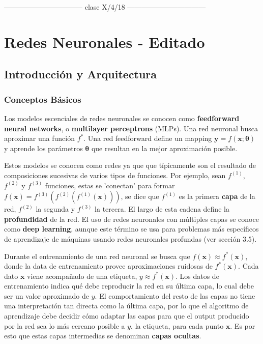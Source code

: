 
\newpage
\centerline{--------------------------------- clase X/4/18 ---------------------------------}
\section{Redes Neuronales - Editado}

\subsection{Introducci\'on y Arquitectura}

\subsubsection{Conceptos B\'asicos}

Los modelos escenciales de redes neuronales se conocen como \textbf{feedforward neural networks}, o \textbf{multilayer perceptrons} (MLPs). Una red neuronal busca aproximar una funci\'on $f^*$. Una red feedforward define un mapping $\bm{y}=f(\bm{x}; \bm{\theta})$ y aprende los par\'ametros $\bm{\theta}$ que resultan en la mejor aproximaci\'on posible.

Estos modelos se conocen como redes ya que que t\'ipicamente son el resultado de composiciones sucesivas de varios tipos de funciones. Por ejemplo, sean $f^{(1)}$, $f^{(2)}$ y $f^{(3)}$ funciones, estas se 'conectan' para formar $f(\bm{x}) = f^{(3)}(f^{(2)}(f^{(1)}(\bm{x})))$, se dice que $f^{(1)}$ es la primera \textbf{capa} de la red, $f^{(2)}$ la segunda y $f^{(3)}$ la tercera. El largo de esta cadena define la \textbf{profundidad} de la red. El uso de redes neuronales con m\'ultiples capas se conoce como \textbf{deep learning}, aunque este t\'ermino se usa para problemas m\'as espec\'ificos de aprendizaje de m\'aquinas usando redes neuronales profundas (ver secci\'on 3.5).

Durante el entrenamiento de una red neuronal se busca que $f(\bm{x}) \approx f^*(\bm{x})$, donde la data de entrenamiento provee aproximaciones ruidosas de $f^*(\bm{x})$. Cada dato $\bm{x}$ viene acompa{\~{n}}ado de una etiqueta, $y \approx f^*(\bm{x})$. Los datos de entrenamiento indica qu\'e debe reproducir la red en su \'ultima capa, lo cual debe ser un valor aproximado de $y$. El comportamiento del resto de las capas no tiene una interpretación tan directa como la última capa, por lo que el algoritmo de aprendizaje debe decidir c\'omo adaptar las capas para que el output producido por la red sea lo m\'as cercano posible a $y$, la etiqueta, para cada punto $\bm{x}$. Es por esto que estas capas intermedias se denominan \textbf{capas ocultas}.

